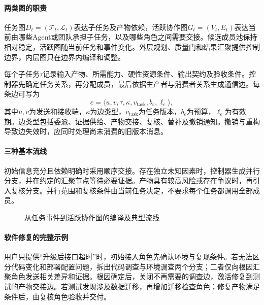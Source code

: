 \paragraph{两类图的职责}
任务图$D_t=(\mathcal{T}_t,\mathcal{L}_t)$表达子任务及产物依赖，活跃协作图$G_t=(V_t,E_t)$表达当前由哪些Agent或团队承担子任务，以及哪些角色之间需要交接。候选成员池保持相对稳定，活跃图随当前任务和事件变化。外层规划、质量门和结果汇聚提供控制边界，内层图只在边界内编译和调整。

每个子任务$\tau$记录输入产物、所需能力、硬性资源条件、输出契约及验收条件。控制器先确定任务关系，再分配成员，最后依据生产者与消费者关系生成通信边。每条边可写为
\begin{equation}
e=\langle u,v,\tau,\kappa,v_{\mathrm{task}},b_e,\ell_e\rangle,
\end{equation}
其中$u,v$为发送和接收端，$\kappa$为边类型，$v_{\mathrm{task}}$为任务版本，$b_e$为预算，$\ell_e$为有效期。边类型包括委派、证据供给、产物交接、复核、替补及撤销通知。撤销与重构导致边失效时，应同时处理尚未消费的旧版本消息。

\paragraph{三种基本流线}
初始信息充分且依赖明确时采用顺序交接。存在独立未知因素时，控制器生成并行分支，并在约定的汇聚节点等待必要证据。产物具有较高风险或存在争议时，再引入复核分支。并行范围和复核条件由当前任务决定，不要求每个任务都调用全部成员。

\begin{figure}[htbp]
\centering
{}
\caption{从任务事件到活跃协作图的编译及典型流线}
\label{fig:mesh_topology}
\end{figure}

\paragraph{软件修复的完整示例}
用户只提供“升级后接口超时”时，初始接入角色先确认环境与复现条件。若无法区分代码变化和部署配置问题，拆出代码调查与环境调查两个分支；二者仅向根因汇聚角色发送相关差异和证据。根因确定后，关闭不再需要的调查边，激活修复到测试的产物交接边。若测试发现涉及数据迁移，再增加迁移检查角色；修复产物满足条件后，由复核角色验收并交付。

